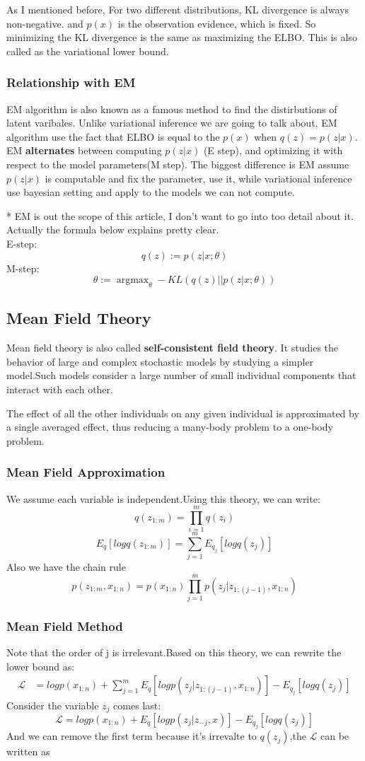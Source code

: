 \documentclass{article}
\begin{document}
As I mentioned before, For two different distributions, KL divergence is always non-negative. and $p(x)$ is the observation evidence, which is fixed. So minimizing the KL divergence is the same as maximizing the ELBO. This is also called as the variational lower bound.
\subsubsection{Relationship with EM}
EM algorithm is also known as a famous method to find the distirbutions of latent varibales. Unlike variational inference we are going to talk about, EM algorithm use the fact that ELBO is equal to the $p(x)$ when $q(z)=p(z|x)$. EM \textbf{alternates} between computing $p(z|x)$ (E step), and optimizing it with respect to the model parameters(M step). The biggest difference is EM assume $p(z|x)$ is computable and fix the parameter, use it, while variational inference use bayesian setting and apply to the models we can not compute. 

* EM is out the scope of this article, I don't want to go into too detail about it. Actually the formula below explains pretty clear.\\
E-step:
$$q(z):=p(z|x;\theta)$$
M-step:
$$\theta:=\mathop{\arg\max}_{\theta} -KL(q(z)||p(z|x;\theta))$$


\subsection{Mean Field Theory}
Mean field theory is also called \textbf{self-consistent field theory}. It studies the behavior of large and complex stochastic models by studying a simpler model.Such models consider a large number of small individual components that interact with each other.

The effect of all the other individuals on any given individual is approximated by a single averaged effect, thus reducing a many-body problem to a one-body problem.
\subsubsection{Mean Field Approximation}
We assume each variable is independent.Using this theory, we can write:
$$q(z_{1:m})= \prod _{i=1}^{m}q(z_{i})$$
$$E_{q}[logq(z_{1:m})]=\sum_{j=1}^{m}E_{q_{j}}[logq(z_{j})]$$
Also we have the chain rule 
$$p(z_{1:m},x_{1:n})=p(x_{1:n}) \prod_{j=1}^{m}p(z_{j}|z_{1:(j-1)},x_{1:n})$$
\subsubsection{Mean Field Method}
Note that the order of j is irrelevant.Based on this theory, we can rewrite the lower bound as:
\begin{align*}
\mathcal{L} &= logp(x_{1:n})+\sum_{j=1}^{m} E_{q}[logp(z_{j}|z_{1:(j-1)},x_{1:n})]-E_{q_{j}}[logq(z_{j})] 
\end{align*}
Consider the variable $z_{j}$ comes last: 
$$\mathcal{L} =logp(x_{1:n})+E_{q}[logp(z_{j}|z_{-j},x)]-E_{q_{j}}[logq(z_{j})]$$
And we can remove the first term because it's irrevalte to $q(z_{j})$,the $\mathcal{L}$ can be written as
\end{document}
